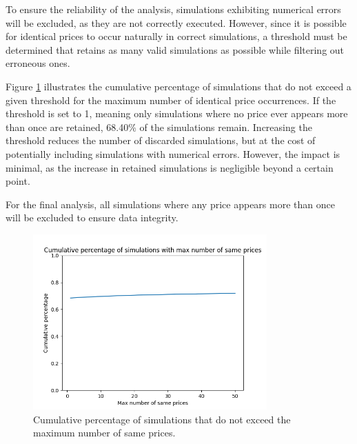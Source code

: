 To ensure the reliability of the analysis, simulations exhibiting numerical errors will be excluded, as they are not correctly executed. However, since it is possible for identical prices to occur naturally in correct simulations, a threshold must be determined that retains as many valid simulations as possible while filtering out erroneous ones.

Figure \ref{fig:max_number_of_same_prices_cumulative_percentage} illustrates the cumulative percentage of simulations that do not exceed a given threshold for the maximum number of identical price occurrences. If the threshold is set to 1, meaning only simulations where no price ever appears more than once are retained, 68.40\% of the simulations remain. Increasing the threshold reduces the number of discarded simulations, but at the cost of potentially including simulations with numerical errors. However, the impact is minimal, as the increase in retained simulations is negligible beyond a certain point.

For the final analysis, all simulations where any price appears more than once will be excluded to ensure data integrity.

\begin{figure}
    \centering
    \includegraphics[width=0.8\textwidth]{img/max_number_of_same_prices_cumulative_percentage.png}
    \caption{Cumulative percentage of simulations that do not exceed the maximum number of same prices.}
    \label{fig:max_number_of_same_prices_cumulative_percentage}
\end{figure}

